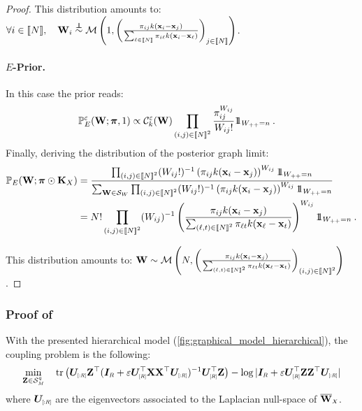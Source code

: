 \begin{proof}
This distribution amounts to: $\forall i \in \integ{N}, \quad \W_{i} \stackrel{\perp\!\!\!\!\perp}{\sim} \mathcal{M}\left(1, \left(\frac{\pi_{ij} k(\mathbf{x}_i - \mathbf{x}_j)}{\sum_{\ell \in \integ{N}} \pi_{i\ell} k(\mathbf{x}_i - \mathbf{x}_{\ell})}\right)_{j \in \integ{N}}\right)$.

\paragraph{$E$-Prior.}
In this case the prior reads:
\begin{align*}
    \mathbb{P}_{E}^{\varepsilon}({\mathbf{W}}; \bm{\pi}, 1) &\propto \mathcal{C}_{k}^{\varepsilon}({\mathbf{W}}) \prod_{(i,j) \in {[\![N]\!]}^2} \frac{\pi_{ij}^{W_{ij}}}{W_{ij}!} 1\!\!1_{W_{++} = n} \:.
\end{align*}
Finally, deriving the distribution of the posterior graph limit:
\begin{align*}
    \mathbb{P}_{E}(\W ;\bm{\pi} \odot \mK_{X}) &= \frac{\prod_{(i,j) \in \integ{N}^2}  (W_{ij}!)^{-1}\left(\pi_{ij} k(\mathbf{x}_i - \mathbf{x}_j)\right)^{W_{ij}} \ind_{W_{++} = n}}{\sum_{\W \in \mathcal{S}_{W}} \prod_{(i,j) \in \integ{N}^2} (W_{ij}!)^{-1} \left(\pi_{ij} k(\mathbf{x}_i - \mathbf{x}_j)\right)^{W_{ij}} \ind_{W_{++} = n}} \\
    &= N! \prod_{(i,j) \in \integ{N}^2} (W_{ij})^{-1} \left(\frac{\pi_{ij} k(\mathbf{x}_i - \mathbf{x}_j)}{\sum_{(\ell,t) \in \integ{N}^2} \pi_{\ell t} k(\mathbf{x}_{\ell} - \mathbf{x}_t)}\right)^{W_{ij}} \ind_{W_{++} = n} \:.
\end{align*}

This distribution amounts to: $\mathbf{W} \sim \mathcal{M}\left(N, \left(\frac{\pi_{ij} k(\mathbf{x}_i - \mathbf{x}_j)}{\sum_{(\ell,t) \in {[\![N]\!]}^2} \pi_{\ell t} k(\mathbf{x}_{\ell} - \mathbf{x}_t)}\right)_{(i,j) \in {[\![N]\!]}^2}\right)$.
\end{proof}

\subsubsection{Proof of }

With the presented hierarchical model (\cref{fig:graphical_model_hierarchical}), the coupling problem is the following:
\begin{align}\label{eq:optim_corollary}
    \min_{\Z \in \mathcal{S}^q_{\scaleto{M}{3pt}}} \quad \operatorname{tr}\left(\bm{U}_{\scaleto{[:R]}{5pt}}\Z^\top(\bm{I}_{\scaleto{R}{4pt}} +  \varepsilon \bm{U}_{\scaleto{[R]}{5pt}}^\top\X\X^\top\bm{U}_{\scaleto{[:R]}{5pt}})^{-1}\bm{U}_{\scaleto{[R]}{5pt}}^\top\Z\right) - \log |\bm{I}_{\scaleto{R}{4pt}}  +  \varepsilon \bm{U}_{\scaleto{[R]}{5pt}}^\top\Z\Z^\top\bm{U}_{\scaleto{[:R]}{5pt}}| 
\end{align}
where $\bm{U}_{\scaleto{[:R]}{5pt}}$ are the eigenvectors associated to the Laplacian null-space of $\overline{\W}_{\scaleto{X}{4pt}}$.

